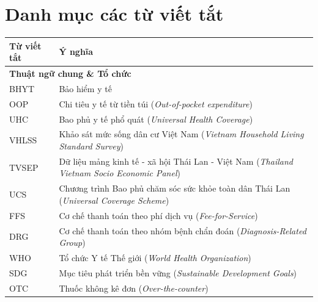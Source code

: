 \documentclass[12pt,a4paper]{article}
\begin{document}
	\newpage
	\tableofcontents  
	
	\clearpage
	\listoffigures   
	
	\listoftables

	\section*{Danh mục các từ viết tắt}
	\begin{table}[htbp]
		\centering
		\renewcommand{\arraystretch}{1.1} %
		\begin{tabular}{lp{12cm}}
			\toprule
			\textbf{Từ viết tắt} & \textbf{Ý nghĩa} \\
			\midrule
			
			\multicolumn{2}{l}{\textbf{Thuật ngữ chung \& Tổ chức}} \\
			BHYT & Bảo hiểm y tế \\
			OOP & Chi tiêu y tế từ tiền túi (\textit{Out-of-pocket expenditure}) \\
			UHC & Bao phủ y tế phổ quát (\textit{Universal Health Coverage}) \\
			VHLSS & Khảo sát mức sống dân cư Việt Nam (\textit{Vietnam Household Living Standard Survey}) \\
			TVSEP & Dữ liệu mảng kinh tế - xã hội Thái Lan - Việt Nam (\textit{Thailand Vietnam Socio Economic Panel}) \\
			UCS & Chương trình Bao phủ chăm sóc sức khỏe toàn dân Thái Lan (\textit{Universal Coverage Scheme}) \\
			FFS & Cơ chế thanh toán theo phí dịch vụ (\textit{Fee-for-Service}) \\
			DRG & Cơ chế thanh toán theo nhóm bệnh chẩn đoán (\textit{Diagnosis-Related Group}) \\
			WHO & Tổ chức Y tế Thế giới (\textit{World Health Organization}) \\
			SDG & Mục tiêu phát triển bền vững (\textit{Sustainable Development Goals}) \\
			OTC & Thuốc không kê đơn (\textit{Over-the-counter}) \\
			

\end{tabular}
\end{table}
\end{document}
